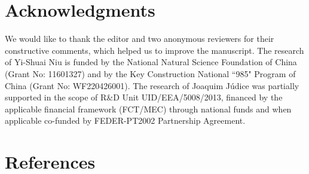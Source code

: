\documentclass[3p]{elsarticle}
\begin{document}
\section*{Acknowledgments}
We would like to thank the editor and two anonymous reviewers for their constructive comments, which helped us to improve the manuscript. The research of Yi-Shuai Niu is funded by the National Natural Science Foundation of China (Grant No: 11601327) and by the Key Construction National ``985" Program of China (Grant No: WF220426001). The research of Joaquim J\'{u}dice was partially supported in the scope of R\&D Unit UID/EEA/5008/2013, financed by the applicable financial framework (FCT/MEC) through national funds and when applicable co-funded by FEDER-PT2002 Partnership Agreement.

\section*{References}


\end{document}

